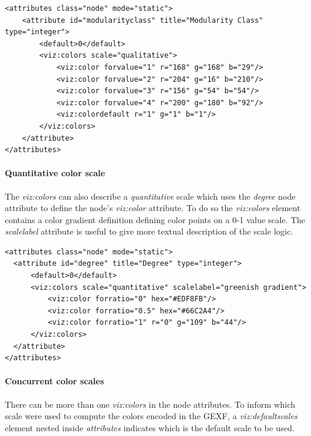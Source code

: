 \documentclass[a4paper,10pt]{article}
\begin{document}
\lstset{ style=gexf }
\begin{lstlisting}[caption={Qualitative color scale},label=vizscalecolorquali]
<attributes class="node" mode="static">
    <attribute id="modularityclass" title="Modularity Class" type="integer">
        <default>0</default>
        <viz:colors scale="qualitative">
            <viz:color forvalue="1" r="168" g="168" b="29"/>
            <viz:color forvalue="2" r="204" g="16" b="210"/>
            <viz:color forvalue="3" r="156" g="54" b="54"/>
            <viz:color forvalue="4" r="200" g="180" b="92"/>
            <viz:colordefault r="1" g="1" b="1"/>
        </viz:colors>
    </attribute>
</attributes>
\end{lstlisting}

\paragraph{Quantitative color scale} The \textit{viz:colors} can also describe a \textit{quantitative} scale which uses the \textit{degree} node attribute to define the node's \textit{viz:color} attribute.
To do so the \textit{viz:colors} element contains a color gradient definition defining color points on a 0-1 value scale. The \textit{scalelabel} attribute is useful to give more textual description of the scale logic.

\lstset{ style=gexf }
\begin{lstlisting}[caption={Quantitative color scale},label=vizscalecolorquanti]
  <attributes class="node" mode="static">
  <attribute id="degree" title="Degree" type="integer">
      <default>0</default>
      <viz:colors scale="quantitative" scalelabel="greenish gradient">
          <viz:color forratio="0" hex="#EDF8FB"/>
          <viz:color forratio="0.5" hex="#66C2A4"/>
          <viz:color forratio="1" r="0" g="109" b="44"/>
      </viz:colors>
  </attribute>
</attributes>
\end{lstlisting}

\paragraph{Concurrent color scales} There can be more than one \textit{viz:colors} in the node attributes. To inform which scale were used to compute the colors encoded in the GEXF, a \textit{viz:defaultscales} element nested inside \textit{attributes} indicates which is the default scale to be used.
\end{document}
